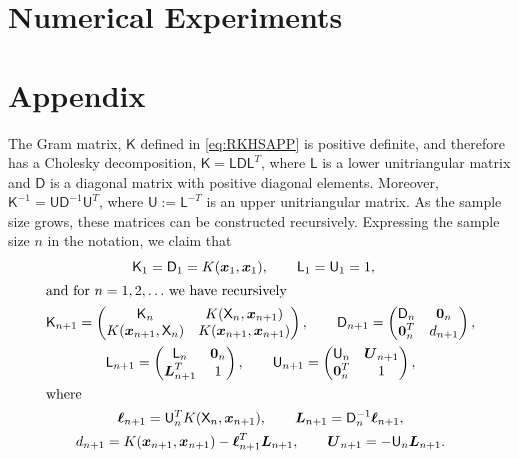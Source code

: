 \documentclass[]{mcom-l}
\theoremstyle{theorem}
\theoremstyle{remark}
\newcommand{\mD}{\mathsf{D}}
\newcommand{\mK}{\mathsf{K}}
\newcommand{\mL}{\mathsf{L}}
\newcommand{\mU}{\mathsf{U}}
\newcommand{\mX}{\mathsf{X}}
\newcommand{\bzero}{\boldsymbol{0}}
\newcommand{\bx}{{\boldsymbol{x}}}
\newcommand{\vell}{{\boldsymbol{\ell}}}
\newcommand{\bL}{{\boldsymbol{L}}}
\newcommand{\bU}{{\boldsymbol{U}}}
\begin{document}
\section{Numerical Experiments}




\section*{Appendix}
The Gram matrix, $\mK$ defined in \eqref{eq:RKHSAPP} is positive definite, and therefore has a Cholesky decomposition, $\mK = \mL \mD \mL^T$, where $\mL$ is a lower unitriangular matrix and $\mD$ is a diagonal matrix with positive diagonal elements.  Moreover, $\mK^{-1} = \mU \mD^{-1} \mU^T$, where $\mU := \mL^{-T}$ is an upper unitriangular matrix. As the sample size grows, these matrices can be constructed recursively.  Expressing the sample size $n$ in the notation, we claim that 
\begin{subequations} \label{eq:cholrecurse}
\begin{gather}
\label{eq:cholrecurseA}
\mK_1  = \mD_1 = K(\bx_1,\bx_1), \qquad \mL_1 = \mU_1 = 1,  \quad \\
\intertext{and for $n = 1, 2, \ldots$ we have recursively}
\label{eq:cholrecurseB}\mK_{n+1} = \begin{pmatrix}
\mK_n & K(\mX_n, \bx_{n+1}) \\
K(\bx_{n+1}, \mX_n) & K(\bx_{n+1}, \bx_{n+1})
\end{pmatrix},
\qquad 
\mD_{n+1} = \begin{pmatrix}
\mD_n & \bzero_n \\
\bzero_n^T & d_{n+1}
\end{pmatrix},
\\
\label{eq:cholrecurseC}
\mL_{n+1} = \begin{pmatrix}
\mL_n & \bzero_n \\
\bL_{n+1}^T  & 1
\end{pmatrix},
\qquad 
\mU_{n+1} = \begin{pmatrix}
\mU_n & \bU_{n+1} \\
\bzero_n^T  & 1
\end{pmatrix}, \\
\intertext{where}
\label{eq:cholrecurseD}
\vell_{n+1} = \mU_n^T K(\mX_n, \bx_{n+1}), \qquad
\bL_{n+1} = \mD_n^{-1} \vell_{n+1}, 
\\
\label{eq:cholrecurseE}
d_{n+1} = K(\bx_{n+1}, \bx_{n+1}) - \vell^T_{n+1} \bL_{n+1}, \qquad
\bU_{n+1} = - \mU_n \bL_{n+1}.
\end{gather}
\end{subequations}
\end{document}
